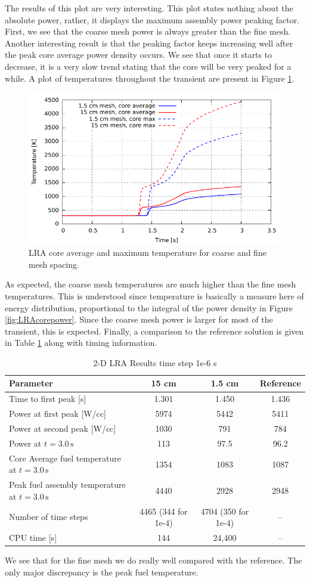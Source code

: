 \documentclass{ansconf}
\numberwithin{equation}{section}
\begin{document}
The results of this plot are very interesting. This plot states nothing about the absolute power, rather, it displays the maximum assembly power peaking factor. First, we see that the coarse mesh power is always greater than the fine mesh. Another interesting result is that the peaking factor keeps increasing well after the peak core average power density occurs. We see that once it starts to decrease, it is a very slow trend stating that the core will be very peaked for a while. A plot of temperatures throughout the transient are present in Figure \ref{fig:LRAcoretemp}.
\begin{figure}
\centering \includegraphics[scale=1.00]{./figs/LRAcoretemp.pdf}
\caption{LRA core average and maximum temperature for coarse and fine mesh spacing.}
\label{fig:LRAcoretemp}
\end{figure}
As expected, the coarse mesh temperatures are much higher than the fine mesh temperatures. This is understood since temperature is basically a measure here of energy distribution, proportional to the integral of the power density in Figure \ref{fig:LRAcorepower}. Since the coarse mesh power is larger for most of the transient, this is expected. Finally, a comparison to the reference solution is given in Table \ref{tab:LRAresults} along with timing information.
\begin{table}
\centering
\caption{2-D LRA Results time step 1e-6 s}
\label{tab:LRAresults}
\begin{tabular}{lccc}
\toprule 
Parameter & 15 cm & 1.5 cm & Reference\tabularnewline
\midrule
\midrule 
Time to first peak {[}s{]} & 1.301 & 1.450 & 1.436\tabularnewline
\midrule 
Power at first peak {[}W/cc{]} & 5974 & 5442 & 5411\tabularnewline
\midrule 
Power at second peak {[}W/cc{]} & 1030 & 791 & 784\tabularnewline
\midrule 
Power at $t=3.0\,\mathrm{s}$ & 113 & 97.5 & 96.2\tabularnewline
\midrule 
Core Average fuel temperature at $t=3.0\,\mathrm{s}$ & 1354 & 1083 & 1087\tabularnewline
\midrule 
Peak fuel assembly temperature at $t=3.0\,\mathrm{s}$ & 4440 & 2928 & 2948\tabularnewline
\midrule
Number of time steps & 4465 (344 for 1e-4)& 4704 (350 for 1e-4) & -- \tabularnewline
\midrule
CPU time {[}s{]} & 144 & 24,400 & --\tabularnewline
\bottomrule
\end{tabular}
\end{table}
We see that for the fine mesh we do really well compared with the reference. The only major discrepancy is the peak fuel temperature.
\end{document}
